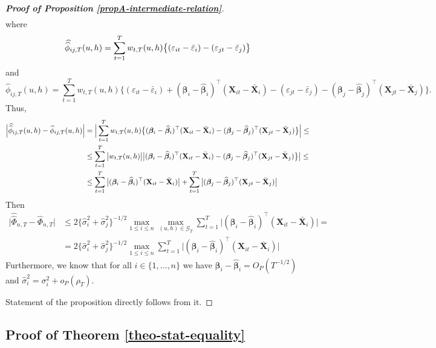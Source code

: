 \documentclass[a4paper,12pt]{article}
\newcommand{\doublehat}[1]{\skew{5.5}\widehat{\widehat{#1}}}
\newcommand{\doublehattwo}[1]{\widehat{\widehat{#1}}}
\begin{document}
\begin{proof}[\textnormal{\textbf{Proof of Proposition \ref{propA-intermediate-relation}}}]
\begin{align*}
\end{align*}
where 
\[\doublehat{\phi}_{ij,T}(u,h) = \sum_{t=1}^T w_{t,T}(u,h) \big\{ (\varepsilon_{it} - \bar{\varepsilon}_i) - (\varepsilon_{jt} - \bar{\varepsilon}_j)  \big\} \]
and 
\[\widehat{\phi}_{ij,T}(u,h) = \sum_{t=1}^T w_{t,T}(u,h) \big\{ (\varepsilon_{it} - \bar{\varepsilon}_i) + (\bm{\beta}_i - \widehat{\bm{\beta}}_i)^\top (\mathbf{X}_{it} - \bar{\mathbf{X}}_{i}) - (\varepsilon_{jt} - \bar{\varepsilon}_j) - (\bm{\beta}_j - \widehat{\bm{\beta}}_j)^\top (\mathbf{X}_{jt} - \bar{\mathbf{X}}_{j}) \big\}.\]
Thus, 
\begin{align*}
\Big| \doublehat{\phi}_{ij, T}(u,h) - \widehat{\phi}_{ij, T}(u,h) \Big| & =\Big| \sum_{t=1}^T w_{t,T}(u,h) \big\{ (\bm{\beta}_i - \widehat{\bm{\beta}}_i)^\top (\mathbf{X}_{it} - \bar{\mathbf{X}}_{i}) - (\bm{\beta}_j - \widehat{\bm{\beta}}_j)^\top (\mathbf{X}_{jt} - \bar{\mathbf{X}}_{j}) \big\} \Big| \le \\
&\le  \sum_{t=1}^T \big|w_{t,T}(u,h)\big| \big| (\bm{\beta}_i - \widehat{\bm{\beta}}_i)^\top (\mathbf{X}_{it} - \bar{\mathbf{X}}_{i})  -(\bm{\beta}_j - \widehat{\bm{\beta}}_j)^\top (\mathbf{X}_{jt} - \bar{\mathbf{X}}_{j}) \big\} \big| \le\\
&\le  \sum_{t=1}^T \big| (\bm{\beta}_i - \widehat{\bm{\beta}}_i)^\top (\mathbf{X}_{it} - \bar{\mathbf{X}}_{i}) \big| + \sum_{t=1}^T \big| (\bm{\beta}_j - \widehat{\bm{\beta}}_j)^\top (\mathbf{X}_{jt} - \bar{\mathbf{X}}_{j}) \big|
\end{align*}
Then
\begin{align*}
\big| \doublehattwo{\Phi}_{n, T} - \widehat{\Phi}_{n, T} \big| &\le 2 \{\widehat{\sigma}_i^2 + \widehat{\sigma}_j^2 \}^{-1/2} \max_{1\le i \le n} \max_{(u,h) \in \mathcal{G}_T}\sum_{t=1}^T \big| (\bm{\beta}_i - \widehat{\bm{\beta}}_i)^\top (\mathbf{X}_{it} - \bar{\mathbf{X}}_{i}) \big| = \\
&= 2 \{\widehat{\sigma}_i^2 + \widehat{\sigma}_j^2 \}^{-1/2} \max_{1\le i \le n} \sum_{t=1}^T \big| (\bm{\beta}_i - \widehat{\bm{\beta}}_i)^\top (\mathbf{X}_{it} - \bar{\mathbf{X}}_{i}) \big|
\end{align*}
Furthermore, we know that for all $i \in \{1, \ldots, n\}$ we have $\bm{\beta}_i - \widehat{\bm{\beta}}_i = O_P(T^{-1/2})$ and $\widehat{\sigma}_i^2 = \sigma_i^2 + o_P(\rho_T)$.

 
Statement of the proposition directly follows from it.
\end{proof}


\subsection*{Proof of Theorem \ref{theo-stat-equality}}
\end{document}
